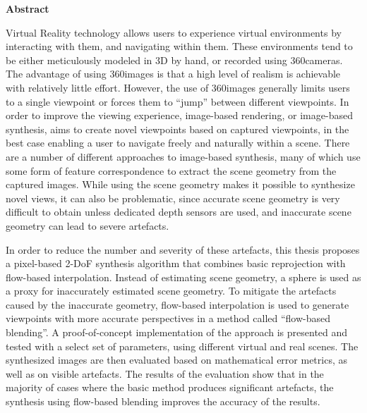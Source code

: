 \vspace*{2cm}

\begin{center}
    \textbf{Abstract}
\end{center}

\vspace*{1cm}

\noindent 
Virtual Reality technology allows users to experience virtual environments by interacting with them, and navigating within them. These environments tend to be either meticulously modeled in 3D by hand, or recorded using 360\degree cameras. The advantage of using 360\degree images is that a high level of realism is achievable with relatively little effort. However, the use of 360\degree images generally limits users to a single viewpoint or forces them to ``jump'' between different viewpoints.
In order to improve the viewing experience,
image-based rendering, or image-based synthesis, aims to create novel viewpoints based on captured viewpoints, in the best case enabling a user to navigate freely and naturally within a scene.
There are a number of different approaches to image-based synthesis, many of which use some form of feature correspondence to extract
 the scene geometry from the captured images.
While using the scene geometry makes it possible to synthesize novel views, it can also be problematic, since accurate scene geometry is very difficult to obtain unless dedicated depth sensors are used, and inaccurate scene geometry can lead to severe artefacts.

In order to reduce the number and severity of these artefacts,
this thesis proposes a pixel-based 2-DoF synthesis algorithm that combines basic reprojection with flow-based interpolation.
Instead of estimating scene geometry, a sphere is used as a proxy for inaccurately estimated scene geometry.
To mitigate the artefacts caused by the inaccurate geometry, flow-based interpolation is used to generate viewpoints with more accurate perspectives in a method called ``flow-based blending''.
A proof-of-concept implementation of the approach is presented and tested with a select set of parameters, using different virtual and real scenes.
The synthesized images are then evaluated based on mathematical error metrics, as well as on visible artefacts. The results of the evaluation show that in the majority of cases where the basic method produces significant artefacts, the synthesis using flow-based blending improves the accuracy of the results.


